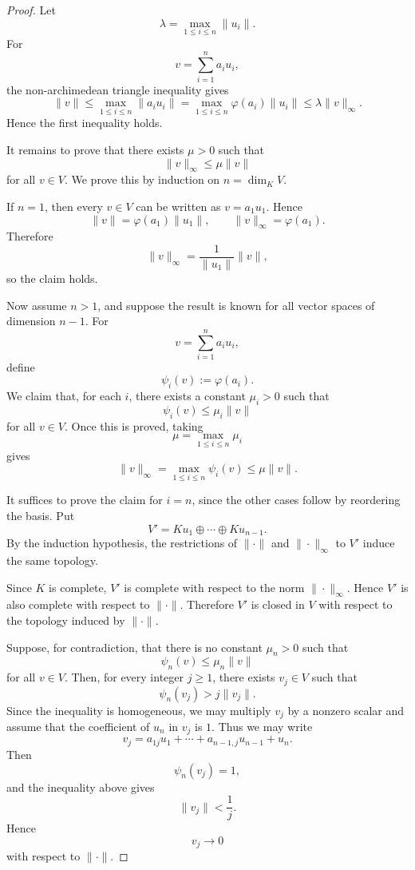\begin{proof}
    Let
    \[
        \lambda=\max_{1\leq i\leq n}\|u_i\|.
    \]
    For
    \[
        v=\sum_{i=1}^{n}a_i u_i,
    \]
    the non-archimedean triangle inequality gives
    \[
        \|v\|
        \leq
        \max_{1\leq i\leq n}\|a_i u_i\|
        =
        \max_{1\leq i\leq n}\varphi(a_i)\|u_i\|
        \leq
        \lambda \|v\|_{\infty}.
    \]
    Hence the first inequality holds.

    It remains to prove that there exists \(\mu>0\) such that
    \[
        \|v\|_{\infty}\leq \mu \|v\|
    \]
    for all \(v\in V\). We prove this by induction on \(n=\dim_K V\).

    If \(n=1\), then every \(v\in V\) can be written as \(v=a_1u_1\). Hence
    \[
        \|v\|=\varphi(a_1)\|u_1\|,
        \qquad
        \|v\|_{\infty}=\varphi(a_1).
    \]
    Therefore
    \[
        \|v\|_{\infty}
        =
        \frac{1}{\|u_1\|}\|v\|,
    \]
    so the claim holds.

    Now assume \(n>1\), and suppose the result is known for all vector spaces of
    dimension \(n-1\). For
    \[
        v=\sum_{i=1}^{n}a_i u_i,
    \]
    define
    \[
        \psi_i(v):=\varphi(a_i).
    \]
    We claim that, for each \(i\), there exists a constant \(\mu_i>0\) such that
    \[
        \psi_i(v)\leq \mu_i\|v\|
    \]
    for all \(v\in V\). Once this is proved, taking
    \[
        \mu=\max_{1\leq i\leq n}\mu_i
    \]
    gives
    \[
        \|v\|_{\infty}
        =
        \max_{1\leq i\leq n}\psi_i(v)
        \leq
        \mu\|v\|.
    \]

    It suffices to prove the claim for \(i=n\), since the other cases follow by
    reordering the basis. Put
    \[
        V' = Ku_1\oplus\cdots\oplus Ku_{n-1}.
    \]
    By the induction hypothesis, the restrictions of \(\|\cdot\|\) and
    \(\|\cdot\|_{\infty}\) to \(V'\) induce the same topology.

    Since \(K\) is complete, \(V'\) is complete with respect to the norm
    \(\|\cdot\|_{\infty}\). Hence \(V'\) is also complete with respect to
    \(\|\cdot\|\). Therefore \(V'\) is closed in \(V\) with respect to the topology
    induced by \(\|\cdot\|\).

    Suppose, for contradiction, that there is no constant \(\mu_n>0\) such that
    \[
        \psi_n(v)\leq \mu_n\|v\|
    \]
    for all \(v\in V\). Then, for every integer \(j\geq 1\), there exists
    \(v_j\in V\) such that
    \[
        \psi_n(v_j)>j\|v_j\|.
    \]
    Since the inequality is homogeneous, we may multiply \(v_j\) by a nonzero scalar
    and assume that the coefficient of \(u_n\) in \(v_j\) is \(1\). Thus we may write
    \[
        v_j=a_{1j}u_1+\cdots+a_{n-1,j}u_{n-1}+u_n.
    \]
    Then
    \[
        \psi_n(v_j)=1,
    \]
    and the inequality above gives
    \[
        \|v_j\|<\frac{1}{j}.
    \]
    Hence
    \[
        v_j\longrightarrow 0
    \]
    with respect to \(\|\cdot\|\).


\end{proof}
